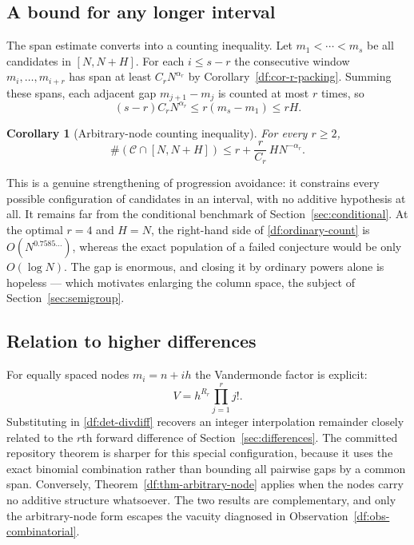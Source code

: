 \documentclass[11pt,oneside]{article}
\newtheorem{corollary}[theorem]{Corollary}
\theoremstyle{definition}
\theoremstyle{remark}
\newcommand{\Cand}{\mathcal C}
\begin{document}
\subsection{A bound for any longer interval}

The span estimate converts into a counting inequality.  Let $m_1<\cdots<m_s$ be all candidates
in $[N,N+H]$.  For each $i\le s-r$ the consecutive window $m_i,\ldots,m_{i+r}$ has span at
least $C_rN^{\alpha_r}$ by Corollary~\ref{df:cor-r-packing}.  Summing these spans, each
adjacent gap $m_{j+1}-m_j$ is counted at most $r$ times, so
\[
 (s-r)C_rN^{\alpha_r}\le r(m_s-m_1)\le rH.
\]

\begin{corollary}[Arbitrary-node counting inequality]
\label{df:cor-ordinary-count}
For every $r\ge2$,
\begin{equation}
 \#(\Cand\cap[N,N+H])\le r+\frac{r}{C_r}\,HN^{-\alpha_r}.
\label{df:ordinary-count}
\end{equation}
\end{corollary}

This is a genuine strengthening of progression avoidance: it constrains every possible
configuration of candidates in an interval, with no additive hypothesis at all.  It remains
far from the conditional benchmark of Section~\ref{sec:conditional}.  At the optimal $r=4$ and
$H=N$, the right-hand side of \eqref{df:ordinary-count} is $O(N^{0.7585\ldots})$, whereas the
exact population of a failed conjecture would be only $O(\log N)$.  The gap is enormous, and
closing it by ordinary powers alone is hopeless --- which motivates enlarging the column space,
the subject of Section~\ref{sec:semigroup}.

\subsection{Relation to higher differences}

For equally spaced nodes $m_i=n+ih$ the Vandermonde factor is explicit:
\[
 V=h^{R_r}\prod_{j=1}^{r}j! .
\]
Substituting in \eqref{df:det-divdiff} recovers an integer interpolation remainder closely
related to the $r$th forward difference of Section~\ref{sec:differences}.  The committed
repository theorem is sharper for this special configuration, because it uses the exact
binomial combination rather than bounding all pairwise gaps by a common span.  Conversely,
Theorem~\ref{df:thm-arbitrary-node} applies when the nodes carry no additive structure
whatsoever.  The two results are complementary, and only the arbitrary-node form escapes the
vacuity diagnosed in Observation~\ref{df:obs-combinatorial}.
\end{document}

